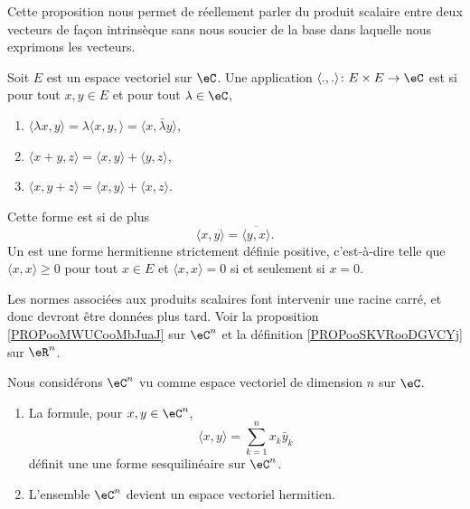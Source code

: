 Cette proposition nous permet de réellement parler du produit scalaire entre deux vecteurs de façon intrinsèque sans nous soucier de la base dans laquelle nous exprimons les vecteurs.

\begin{definition}  \label{DefMZQxmQ}
    Soit \( E\) est un espace vectoriel sur \( \eC\). Une application \( \langle ., .\rangle \colon E\times E\to \eC\) est  si pour tout \( x,y\in E\) et pour tout \( \lambda\in \eC\),
    \begin{enumerate}
        \item
            \( \langle \lambda x, y\rangle =\lambda\langle x,y, \rangle =\langle x, \bar\lambda y\rangle \),
        \item
            \( \langle x+y, z\rangle =\langle x, y\rangle+\langle y, z\rangle  \),
        \item
            \( \langle x, y+z\rangle =\langle x, y\rangle +\langle x, z\rangle \).
    \end{enumerate}
    Cette forme est  si de plus
    \begin{equation}
        \langle x, y\rangle =\overline{ \langle y, x\rangle  }.
    \end{equation}
    Un  est une forme hermitienne strictement définie positive, c'est-à-dire telle que \( \langle x, x\rangle \geq 0\) pour tout \( x\in E\) et \( \langle x, x\rangle =0\) si et seulement si \( x=0\).
\end{definition}

\begin{normaltext}
    Les normes associées aux produits scalaires font intervenir une racine carré, et donc devront être données plus tard. Voir la proposition \ref{PROPooMWUCooMbJuaJ} sur \( \eC^n\) et la définition \ref{PROPooSKVRooDGVCYj} sur \( \eR^n\).
\end{normaltext}

\begin{proposition}      \label{PROPooMWUCooMbJuaJ}
    Nous considérons \(\eC^n\) vu comme espace vectoriel de dimension \( n\) sur \( \eC\).
    \begin{enumerate}
        \item
            La formule, pour \( x,y\in \eC^n\),
    \begin{equation}    \label{EqFormSesqQrjyPH}
        \langle x, y\rangle =\sum_{k=1}^nx_k\bar y_k
    \end{equation}
    définit une une forme sesquilinéaire sur \( \eC^n\).
\item
    L'ensemble \( \eC^n\) devient un espace vectoriel hermitien.
    \end{enumerate}
\end{proposition}


